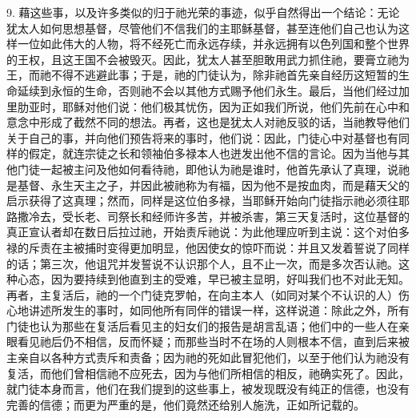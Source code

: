 9. 藉这些事，以及许多类似的归于祂光荣的事迹，似乎自然得出一个结论：无论犹太人如何思想基督，尽管他们不信我们的主耶稣基督，甚至连他们自己也认为这样一位如此伟大的人物，将不经死亡而永远存续，并永远拥有以色列国和整个世界的王权，且这王国不会被毁灭。因此，犹太人甚至胆敢用武力抓住祂，要膏立祂为王，而祂不得不逃避此事；于是，祂的门徒认为，除非祂首先亲自经历这短暂的生命延续到永恒的生命，否则祂不会以其他方式赐予他们永生。最后，当他们经过加里肋亚时，耶稣对他们说：他们极其忧伤，因为正如我们所说，他们先前在心中和意念中形成了截然不同的想法。再者，这也是犹太人对祂反驳的话，当祂教导他们关于自己的事，并向他们预告将来的事时，他们说：因此，门徒心中对基督也有同样的假定，就连宗徒之长和领袖伯多禄本人也迸发出他不信的言论。因为当他与其他门徒一起被主问及他如何看待祂，即他认为祂是谁时，他首先承认了真理，说祂是基督、永生天主之子，并因此被祂称为有福，因为他不是按血肉，而是藉天父的启示获得了这真理；然而，同样是这位伯多禄，当耶稣开始向门徒指示祂必须往耶路撒冷去，受长老、司祭长和经师许多苦，并被杀害，第三天复活时，这位基督的真正宣认者却在数日后拉过祂，开始责斥祂说：为此他理应听到主说：这个对伯多禄的斥责在主被捕时变得更加明显，他因使女的惊吓而说：并且又发着誓说了同样的话；第三次，他诅咒并发誓说不认识那个人，且不止一次，而是多次否认祂。这种心态，因为要持续到他直到主的受难，早已被主显明，好叫我们也不对此无知。再者，主复活后，祂的一个门徒克罗帕，在向主本人（如同对某个不认识的人）伤心地讲述所发生的事时，如同他所有同伴的错误一样，这样说道：除此之外，所有门徒也认为那些在复活后看见主的妇女们的报告是胡言乱语；他们中的一些人在亲眼看见祂后仍不相信，反而怀疑；而那些当时不在场的人则根本不信，直到后来被主亲自以各种方式责斥和责备；因为祂的死如此冒犯他们，以至于他们认为祂没有复活，而他们曾相信祂不应死去，因为与他们所相信的相反，祂确实死了。因此，就门徒本身而言，他们在我们提到的这些事上，被发现既没有纯正的信德，也没有完善的信德；而更为严重的是，他们竟然还给别人施洗，正如所记载的。\par

